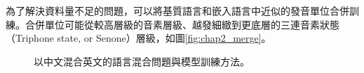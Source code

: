 為了解決資料量不足的問題，可以將基質語言和嵌入語言中近似的發音單位合併訓練\cite{yeh2012recognition}。合併單位可能從較高層級的音素層級、越發細緻到更底層的三連音素狀態（Triphone state, or Senone）層級，如圖\ref{fig:chap2_merge}。
\begin{figure}
\centering
{}
\caption{以中文混合英文的語言混合問題與模型訓練方法。}
\end{figure}

